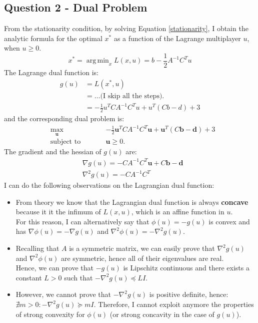 \documentclass[]{article}
\DeclareMathOperator*{\argmin}{arg\,min}
\begin{document}
\subsection*{Question 2 - Dual Problem}
From the stationarity condition, by solving Equation \ref{stationarity}, I obtain the analytic formula for the optimal $x^*$ as a function of the Lagrange multiplayer $u$, when $u\geq0$.
\[
x^* = \argmin_x L(x,u) =  b-\frac{1}{2}A^{-1}C^Tu
\]
The Lagrange dual function is:
\begin{equation*}
	\begin{aligned}
		g(u) &= L(x^*,u)\\
		&=\dots \text{(I skip all the steps).}\\
		&= -\frac{1}{2}u^TCA^{-1}C^Tu+u^T(Cb-d)+3 
	\end{aligned}
\end{equation*}
and the corresponding dual problem is:
\begin{subequations}
	\begin{alignat*}{2}
		&\!\max_{\mathbf{u}} &\qquad& -\frac{1}{2}\mathbf{u}^TCA^{-1}C^T\mathbf{u}+\mathbf{u}^T(C\mathbf{b}-\mathbf{d})+3\\
		&\text{subject to} & & \mathbf{u}\geq 0.
	\end{alignat*}
\end{subequations}
The gradient and the hessian of $g(u)$ are:
\begin{equation*}
	\begin{aligned}
		& \nabla g(u) = -CA^{-1}C^T\mathbf{u}+C\mathbf{b}-\mathbf{d}\\
		& \nabla^2 g(u) =-CA^{-1}C^T
	\end{aligned}
\end{equation*}
I can do the following observations on the Lagrangian dual function:
\begin{itemize}
	\item From theory we know that the Lagrangian dual function is always \textbf{concave} because it it the infimum of $L(x,u)$, which is an affine function in $u$.\\
	For this reason, I can alternatively say that $\phi(u) = -g(u)$ is convex and has $\nabla \phi(u) = -\nabla g(u)$ and $\nabla^2 \phi(u) = -\nabla^2 g(u)$.
	\item Recalling that $A$ is a symmetric matrix, we can easily prove that $ \nabla^2 g(u)$ and $\nabla^2 \phi(u)$ are symmetric, hence all of their eigenvalues are real.\\
	Hence, we can prove that $-g(u)$ is Lipschitz continuous and there exists a constant $L>0$ such that $-\nabla^2 g(u) \preceq LI$.
	\item However, we cannot prove that $-\nabla^2 g(u)$ is positive definite, hence:\\
	$\nexists m>0: -\nabla^2 g(u) \succeq mI$. Therefore, I cannot exploit anymore the properties of strong convexity for $\phi(u)$ (or strong concavity in the case of $g(u)$).
\end{itemize}
\end{document}

